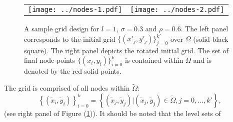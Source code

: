 \begin{figure}
  \centering
  \begin{tabular}{cc}
    \begin{minipage}{0.4\textwidth}
      \centering
      \texttt{[image: ../nodes-1.pdf]}
    \end{minipage}
    & \begin{minipage}{0.4\textwidth}
      \centering
      \texttt{[image: ../nodes-2.pdf]}
    \end{minipage}
  \end{tabular}
  \caption{A sample grid design for $l=1$, $\sigma=0.3$ and $\rho=0.6$. The
    left panel corresponds to the initial grid
    $\{ (x'_j,y'_j) \}_{j=0}^{k'}$ over $\Omega$ (solid black
    square). The right panel depicts the rotated initial grid. The set
    of final node points $\{ (x_i,y_i) \}_{i=0}^{k}$ is contained
    within $\Omega$ and is denoted by the red solid points.}
  \label{fig:grids}
\end{figure}
The grid is comprised of all nodes within $\tilde{\Omega}$:
\[\left\{(\tilde{x}_i, \tilde{y}_i)\right\}_{i=0}^k = \left\{
    (\tilde{x}_j, \tilde{y}_j) | (\tilde{x}_j, \tilde{y}_j) \in
    \tilde{\Omega}, j = 0, \ldots, k' \right\}, \] (see right panel of
Figure (\ref{fig:grids})). It should be noted that the level sets of
